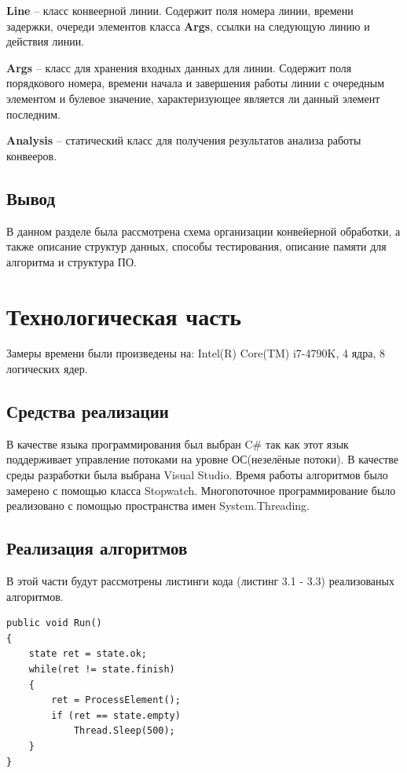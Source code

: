 \documentclass[12pt]{report}
\begin{document}
\textbf{Line} -- класс конвеерной линии. Содержит поля номера линии, времени задержки, очереди элементов класса \textbf{Args}, ссылки на следующую линию и действия линии.

\textbf{Args} -- класс для хранения входных данных для линии. Содержит поля порядкового номера, времени начала и завершения работы линии с очередным элементом и булевое значение, характеризующее является ли данный элемент последним.

\textbf{Analysis} -- статический класс для получения результатов анализа работы конвееров.

\section*{Вывод}
В данном разделе была рассмотрена схема организации конвейерной обработки, а также описание структур данных, способы тестирования, описание памяти для алгоритма и структура ПО.


\newpage
\chapter{Технологическая часть}
Замеры времени были произведены на: Intel(R) Core(TM) i7-4790K, 4 ядра, 8 логических ядер.


\section{Средства реализации}
В качестве языка программирования был выбран C\# \cite{Microsoft} так как этот
язык поддерживает управление потоками на уровне ОС(незелёные потоки). В качестве среды разработки была выбрана Visual Studio. 
Время работы алгоритмов было замерено с помощью класса Stopwatch. Многопоточное программирование было
реализовано с помощью пространства имен System.Threading.


\section{Реализация алгоритмов}
В этой части будут рассмотрены листинги кода (листинг 3.1 - 3.3) реализованых алгоритмов.

\captionsetup{singlelinecheck = false, justification=raggedright}
\begin{lstlisting}[label=some-code,caption=Функция для запуска в потоке]
public void Run()
{
    state ret = state.ok;
    while(ret != state.finish)
    {
        ret = ProcessElement();
        if (ret == state.empty)
            Thread.Sleep(500);
    }
}
\end{lstlisting}
\end{document}
